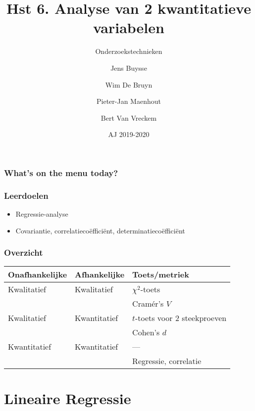 \documentclass[aspectratio=169]{beamer}
\title[OZT: aan de slag]{Hst 6. Analyse van 2 kwantitatieve variabelen}
\subtitle{Onderzoekstechnieken}
\author{Jens Buysse \and Wim {De Bruyn} \and Pieter-Jan Maenhout \and Bert {Van Vreckem}}
\date{AJ 2019-2020}
\begin{document}
\begin{frame}
  \maketitle
\end{frame}

\begin{frame}
  \frametitle{What's on the menu today?}
  
  \tableofcontents
\end{frame}

\begin{frame}
  \frametitle{Leerdoelen}
  
  \begin{itemize}
    \item Regressie-analyse
    \item Covariantie, correlatiecoëfficiënt, determinatiecoëfficiënt
  \end{itemize}
\end{frame}

\begin{frame}
  \frametitle{Overzicht}
    \centering
    \begin{tabular}{lll}
    	\toprule
    	\textbf{Onafhankelijke} & \textbf{Afhankelijke} & \textbf{Toets/metriek}        \\
    	\midrule
    	Kwalitatief             & Kwalitatief           & $\chi^2$-toets                \\
    	                        &                       & Cramér's $V$                  \\
    	Kwalitatief             & Kwantitatief          & $t$-toets voor 2 steekproeven \\
    	                        &                       & Cohen's $d$                   \\
    	Kwantitatief            & Kwantitatief          & ---                           \\
    	                        &                       & Regressie, correlatie         \\
    	\bottomrule
    \end{tabular}
\end{frame}

\section{Lineaire Regressie}
\end{document}
